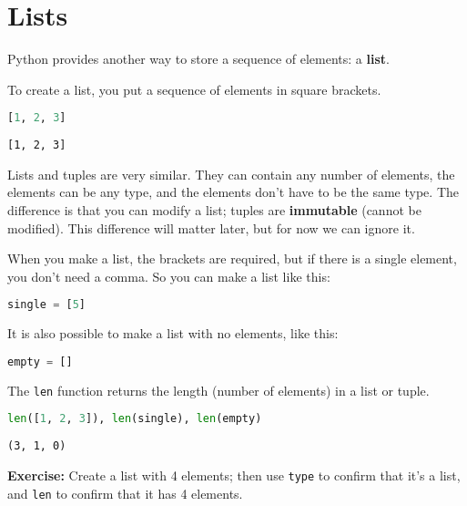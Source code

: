 \hypertarget{lists}{%
\section{Lists}\label{lists}}

Python provides another way to store a sequence of elements: a
\textbf{list}.

To create a list, you put a sequence of elements in square brackets.

\begin{lstlisting}[language=Python,style=source]
[1, 2, 3]
\end{lstlisting}

\begin{lstlisting}[style=output]
[1, 2, 3]
\end{lstlisting}

Lists and tuples are very similar. They can contain any number of
elements, the elements can be any type, and the elements don't have to
be the same type. The difference is that you can modify a list; tuples
are \textbf{immutable} (cannot be modified). This difference will matter
later, but for now we can ignore it.

When you make a list, the brackets are required, but if there is a
single element, you don't need a comma. So you can make a list like
this:

\begin{lstlisting}[language=Python,style=source]
single = [5]
\end{lstlisting}

It is also possible to make a list with no elements, like this:

\begin{lstlisting}[language=Python,style=source]
empty = []
\end{lstlisting}

The \passthrough{\lstinline!len!} function returns the length (number of
elements) in a list or tuple.

\begin{lstlisting}[language=Python,style=source]
len([1, 2, 3]), len(single), len(empty)
\end{lstlisting}

\begin{lstlisting}[style=output]
(3, 1, 0)
\end{lstlisting}

\textbf{Exercise:} Create a list with 4 elements; then use
\passthrough{\lstinline!type!} to confirm that it's a list, and
\passthrough{\lstinline!len!} to confirm that it has 4 elements.

